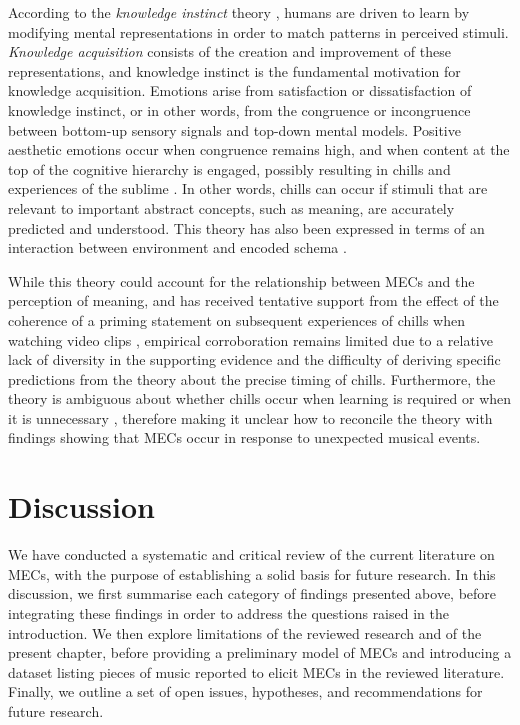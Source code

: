 According to the \emph{knowledge instinct} theory \parencite[see][]{schoeller2018b}, humans are driven to learn by modifying mental representations in order to match patterns in perceived stimuli. \emph{Knowledge acquisition} consists of the creation and improvement of these representations, and knowledge instinct is the fundamental motivation for knowledge acquisition. Emotions arise from satisfaction or dissatisfaction of knowledge instinct, or in other words, from the congruence or incongruence between bottom-up sensory signals and top-down mental models. Positive aesthetic emotions occur when congruence remains high, and when content at the top of the cognitive hierarchy is engaged, possibly resulting in chills and experiences of the sublime \parencite{schoeller2016, schoeller2018a, schoeller2018b}. In other words, chills can occur if stimuli that are relevant to important abstract concepts, such as meaning, are accurately predicted and understood. This theory has also been expressed in terms of an interaction between environment and encoded schema \parencite{pelowski2017, pelowski2018}.

While this theory could account for the relationship between MECs and the perception of meaning, and has received tentative support from the effect of the coherence of a priming statement on subsequent experiences of chills when watching video clips \parencite{schoeller2015, schoeller2016, schoeller2018a}, empirical corroboration remains limited due to a relative lack of diversity in the supporting evidence and the difficulty of deriving specific predictions from the theory about the precise timing of chills. Furthermore, the theory is ambiguous about whether chills occur when learning is required or when it is unnecessary \parencite{pelowski2018}, therefore making it unclear how to reconcile the theory with findings showing that MECs occur in response to unexpected musical events.


\section{Discussion}
\label{se:rev-discussion}

We have conducted a systematic and critical review of the current literature on MECs, with the purpose of establishing a solid basis for future research. In this discussion, we first summarise each category of findings presented above, before integrating these findings in order to address the questions raised in the introduction. We then explore limitations of the reviewed research and of the present chapter, before providing a preliminary model of MECs and introducing a dataset listing pieces of music reported to elicit MECs in the reviewed literature. Finally, we outline a set of open issues, hypotheses, and recommendations for future research.

